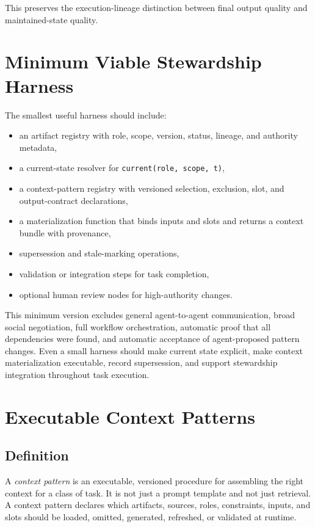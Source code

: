 \documentclass{article}
\begin{document}
This preserves the execution-lineage distinction between final output quality and maintained-state quality.

\section{Minimum Viable Stewardship Harness}

The smallest useful harness should include:
\begin{itemize}[leftmargin=*]
\item an artifact registry with role, scope, version, status, lineage, and authority metadata,
\item a current-state resolver for \texttt{current(role, scope, t)},
\item a context-pattern registry with versioned selection, exclusion, slot, and output-contract declarations,
\item a materialization function that binds inputs and slots and returns a context bundle with provenance,
\item supersession and stale-marking operations,
\item validation or integration steps for task completion,
\item optional human review nodes for high-authority changes.
\end{itemize}

This minimum version excludes general agent-to-agent communication, broad social negotiation, full workflow orchestration, automatic proof that all dependencies were found, and automatic acceptance of agent-proposed pattern changes. Even a small harness should make current state explicit, make context materialization executable, record supersession, and support stewardship integration throughout task execution.

\section{Executable Context Patterns}

\subsection{Definition}

A \emph{context pattern} is an executable, versioned procedure for assembling the right context for a class of task. It is not just a prompt template and not just retrieval. A context pattern declares which artifacts, sources, roles, constraints, inputs, and slots should be loaded, omitted, generated, refreshed, or validated at runtime.
\end{document}
